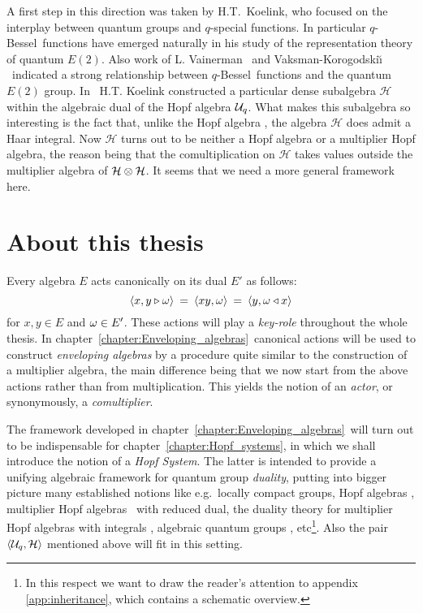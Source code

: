 A first step in this direction was taken by \mbox{H.T. Koelink},
who focused on the interplay between quantum groups and $q$-special functions.
In particular \mbox{$q$-Bessel}\ functions have emerged naturally in his study of
the representation theory of quantum $E(2)$.
Also work of L. Vainerman \cite{leonid:vainerman}\ and Vaksman-Korogodski\u{\i}
\cite{VaksKor:QE2}\ indicated a strong relationship between \mbox{$q$-Bessel}\
functions and the quantum $E(2)$ group.
In \cite{Koelink:QE2}\ H.T. Koelink constructed a particular dense subalgebra
$\mathcal{H}$ within the algebraic dual of the Hopf algebra ${\mathcal U}_q$.
What makes this subalgebra so interesting is the fact that,
unlike the Hopf algebra \Aq, the algebra $\mathcal{H}$ does admit a Haar integral.
Now $\mathcal{H}$ turns out to be neither a Hopf algebra or a multiplier Hopf algebra,
the reason being that the comultiplication on $\mathcal{H}$ takes values
outside the multiplier algebra of $\mathcal{H} \otimes \mathcal{H}$.
It seems that we need a more general framework here.

\newpage


\section{About this thesis}

Every algebra $E$ acts canonically on its dual $E'$ as follows:
$$  \langle x,y\triangleright \omega \rangle \:=\: \langle xy,\omega \rangle \:=\: \langle y,\omega\triangleleft x \rangle $$
for $x,y \in E$ and $\omega \in E'$.
These actions will play a {\em key-role\/} throughout the whole thesis.
In \mbox{chapter \ref{chapter:Enveloping_algebras}}\ canonical actions will be used to
construct {\em enveloping algebras\/} by a procedure quite similar to the construction
of a multiplier algebra, the main difference being that we now start from the above
actions rather than from multiplication.
This yields the notion of an {\em actor}, or synonymously, a {\em comultiplier}\@.
\vspace{1ex}

The framework developed in \mbox{chapter \ref{chapter:Enveloping_algebras}}\ will
turn out to be indispensable for \mbox{chapter \ref{chapter:Hopf_systems}},
in which we shall introduce the notion of a {\em Hopf System}\@.
The latter is intended to provide a unifying algebraic framework for quantum group
{\em duality}, putting into bigger picture many established notions like e.g.\
locally compact groups,
Hopf algebras
\cite{Schmudgen,Majid,Fons:DPHA},
multiplier Hopf algebras \cite{Fons:MHA}\ with reduced dual,
the duality theory for multiplier Hopf algebras with integrals
\cite{Fons:AFGD,Fons:AFGD:proc,Fons:pnas},
algebraic quantum groups
\cite{Kust:Cstar,Kust:thesis},
etc\footnote{ In this respect we want to draw the reader's attention to
appendix \ref{app:inheritance}, which contains a schematic overview.}\@.
Also the pair $\langle {\mathcal U}_q,\mathcal{H} \rangle$ mentioned above will fit in this setting.
\vspace{1ex}


